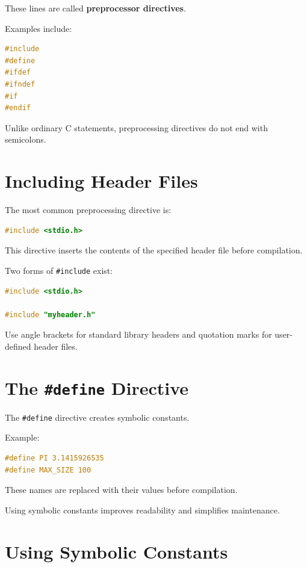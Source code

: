 \documentclass[12pt,openany]{book}
\begin{document}
These lines are called \textbf{preprocessor directives}.

Examples include:

\begin{lstlisting}[language=C]
#include
#define
#ifdef
#ifndef
#if
#endif
\end{lstlisting}

Unlike ordinary C statements, preprocessing directives do not end with semicolons.

\section{Including Header Files}

The most common preprocessing directive is:

\begin{lstlisting}[language=C]
#include <stdio.h>
\end{lstlisting}

This directive inserts the contents of the specified header file before compilation.

Two forms of \texttt{\#include} exist:

\begin{lstlisting}[language=C]
#include <stdio.h>

#include "myheader.h"
\end{lstlisting}

Use angle brackets for standard library headers and quotation marks for user-defined header files.

\section{The \texttt{\#define} Directive}

The \texttt{\#define} directive creates symbolic constants.

Example:

\begin{lstlisting}[language=C]
#define PI 3.1415926535
#define MAX_SIZE 100
\end{lstlisting}

These names are replaced with their values before compilation.

Using symbolic constants improves readability and simplifies maintenance.
\section{Using Symbolic Constants}
\end{document}
